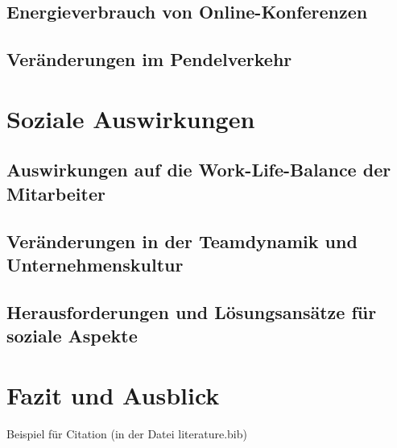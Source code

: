 \documentclass[runningheads]{llncs}
\begin{document}
\subsection{Energieverbrauch von Online-Konferenzen}

\subsection{Veränderungen im Pendelverkehr}


\newpage
\section{Soziale Auswirkungen}

\subsection{Auswirkungen auf die Work-Life-Balance der Mitarbeiter}

\subsection{Veränderungen in der Teamdynamik und Unternehmenskultur}

\subsection{Herausforderungen und Lösungsansätze für soziale Aspekte}


\newpage
\section{Fazit und Ausblick}

Beispiel für Citation\cite{noauthor_internet-konferenz_2021}
(in der Datei literature.bib)


\newpage


\end{document}
